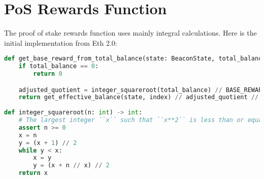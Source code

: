\lstset{style=mystyle}

\section{PoS Rewards Function}
The proof of stake rewards function uses mainly integral calculations. Here is the initial implementation from Eth 2.0: 

\begin{lstlisting}[language=Python]
def get_base_reward_from_total_balance(state: BeaconState, total_balance: Gwei, index: ValidatorIndex) -> Gwei:
    if total_balance == 0:
        return 0

    adjusted_quotient = integer_squareroot(total_balance) // BASE_REWARD_QUOTIENT
    return get_effective_balance(state, index) // adjusted_quotient // 5
    
def integer_squareroot(n: int) -> int:
    # The largest integer ``x`` such that ``x**2`` is less than or equal to ``n``.
    assert n >= 0
    x = n
    y = (x + 1) // 2
    while y < x:
        x = y
        y = (x + n // x) // 2
    return x

\end{lstlisting}